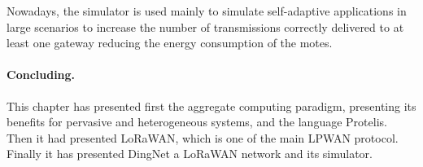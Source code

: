 Nowadays, the simulator is used mainly to simulate self-adaptive applications in large scenarios to increase the number of transmissions correctly delivered to at least one gateway reducing the energy consumption of the motes.

\paragraph{Concluding.} This chapter has presented first the aggregate computing paradigm, presenting its benefits for pervasive and heterogeneous systems, and the language Protelis. Then it had presented LoRaWAN, which is one of the main LPWAN protocol. 
Finally it has presented DingNet a LoRaWAN network and its simulator.